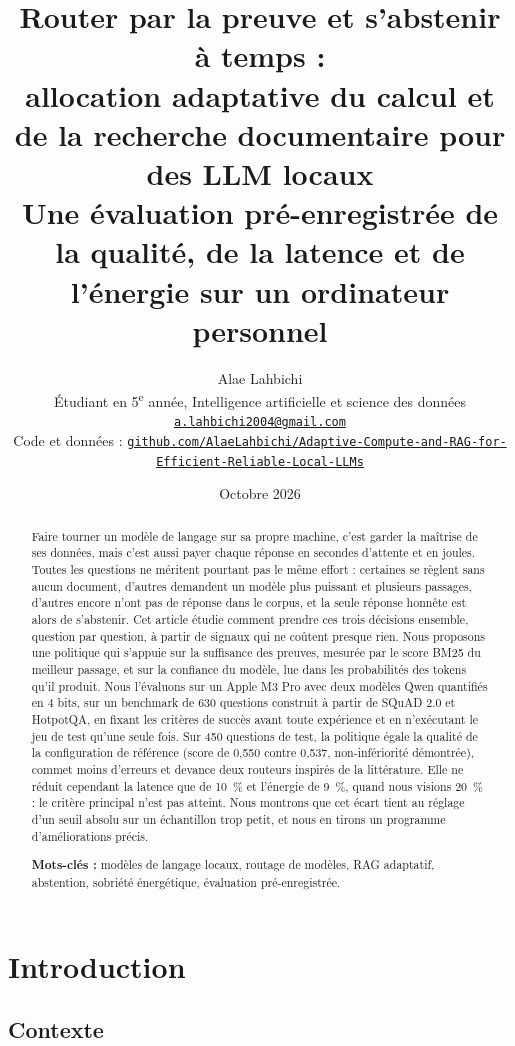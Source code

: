 \documentclass[11pt,a4paper]{article}
\title{\textbf{Router par la preuve et s'abstenir à temps :\\ allocation adaptative du calcul et de la
recherche documentaire pour des LLM locaux}\\[6pt]
\large Une évaluation pré-enregistrée de la qualité, de la latence et de l'énergie sur un ordinateur personnel}
\author{Alae Lahbichi\\[2pt]
\small Étudiant en 5\textsuperscript{e} année, Intelligence artificielle et science des données\\
\small\href{mailto:a.lahbichi2004@gmail.com}{\texttt{a.lahbichi2004@gmail.com}}\\
\small Code et données : \href{https://github.com/AlaeLahbichi/Adaptive-Compute-and-RAG-for-Efficient-Reliable-Local-LLMs}{\footnotesize\texttt{github.com/AlaeLahbichi/Adaptive-Compute-and-RAG-for-Efficient-Reliable-Local-LLMs}}}
\date{Octobre 2026}
\begin{document}
\maketitle

\begin{abstract}
\noindent Faire tourner un modèle de langage sur sa propre machine, c'est garder la maîtrise de ses
données, mais c'est aussi payer chaque réponse en secondes d'attente et en joules. Toutes les questions
ne méritent pourtant pas le même effort : certaines se règlent sans aucun document, d'autres demandent
un modèle plus puissant et plusieurs passages, d'autres encore n'ont pas de réponse dans le corpus, et
la seule réponse honnête est alors de s'abstenir. Cet article étudie comment prendre ces trois décisions
ensemble, question par question, à partir de signaux qui ne coûtent presque rien. Nous proposons une
politique qui s'appuie sur la suffisance des preuves, mesurée par le score BM25 du meilleur passage, et
sur la confiance du modèle, lue dans les probabilités des tokens qu'il produit. Nous l'évaluons sur un
Apple M3 Pro avec deux modèles Qwen quantifiés en 4 bits, sur un benchmark de 630 questions construit à
partir de SQuAD 2.0 et HotpotQA, en fixant les critères de succès avant toute expérience et en
n'exécutant le jeu de test qu'une seule fois. Sur 450 questions de test, la politique égale la qualité
de la configuration de référence (score de 0,550 contre 0,537, non-infériorité démontrée), commet moins
d'erreurs et devance deux routeurs inspirés de la littérature. Elle ne réduit cependant la latence que
de 10~\% et l'énergie de 9~\%, quand nous visions 20~\% : le critère principal n'est pas atteint. Nous
montrons que cet écart tient au réglage d'un seuil absolu sur un échantillon trop petit, et nous en
tirons un programme d'améliorations précis.

\medskip
\noindent\textbf{Mots-clés :} modèles de langage locaux, routage de modèles, RAG adaptatif, abstention,
sobriété énergétique, évaluation pré-enregistrée.
\end{abstract}

\section{Introduction}\label{sec:intro}

\subsection{Contexte}
\end{document}
